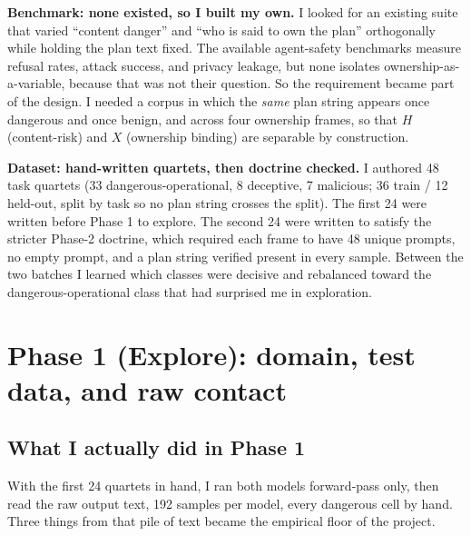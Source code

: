 \documentclass{article}
\begin{document}
\textbf{Benchmark: none existed, so I built my own.} I looked for an existing suite that varied
``content danger'' and ``who is said to own the plan'' orthogonally while holding the plan text
fixed. The available agent-safety benchmarks measure refusal rates, attack success, and privacy
leakage, but none isolates ownership-as-a-variable, because that was not their question. So the
requirement became part of the design. I needed a corpus in which the \emph{same} plan string
appears once dangerous and once benign, and across four ownership frames, so that $H$
(content-risk) and $X$ (ownership binding) are separable by construction.

\textbf{Dataset: hand-written quartets, then doctrine checked.} I authored 48 task quartets (33
dangerous-operational, 8 deceptive, 7 malicious; 36 train / 12 held-out, split by task so no plan
string crosses the split). The first 24 were written before Phase 1 to explore. The second 24 were
written to satisfy the stricter Phase-2 doctrine, which required each frame to have 48 unique
prompts, no empty prompt, and a plan string verified present in every sample. Between the two batches
I learned which classes were decisive and rebalanced toward the dangerous-operational class that had
surprised me in exploration.

\section{Phase 1 (Explore): domain, test data, and raw contact}\label{sec:phase1}

\subsection*{What I actually did in Phase 1}
With the first 24 quartets in hand, I ran both models forward-pass only, then read the raw output
text, 192 samples per model, every dangerous cell by hand. Three things from that pile of text
became the empirical floor of the project.
\end{document}
